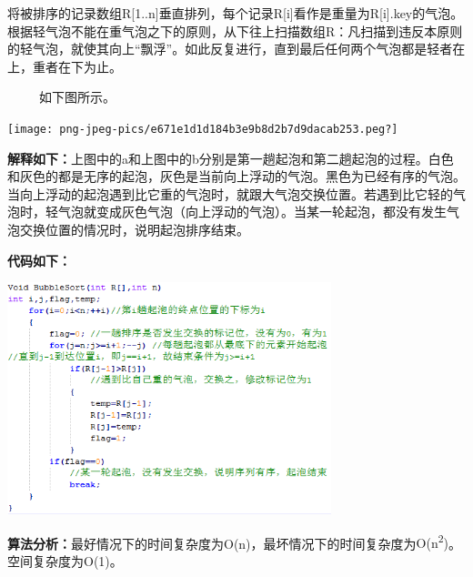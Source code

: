 {将被排序的记录数组R{[}1..n{]}垂直排列，每个记录R{[}i{]}看作是重量为R{[}i{]}.key的气泡。根据轻气泡不能在重气泡之下的原则，从下往上扫描数组R：凡扫描到违反本原则的轻气泡，就使其向上``飘浮''。如此反复进行，直到最后任何两个气泡都是轻者在上，重者在下为止。}

{~ ~ ~ 如下图所示。}

{\texttt{[image: png-jpeg-pics/e671e1d1d184b3e9b8d2b7d9dacab253.peg?]}\\
\hspace*{0.333em}}

{\textbf{解释如下：}上图中的a和上图中的b分别是第一趟起泡和第二趟起泡的过程。白色和灰色的都是无序的起泡，灰色是当前向上浮动的气泡。黑色为已经有序的气泡。当向上浮动的起泡遇到比它重的气泡时，就跟大气泡交换位置。若遇到比它轻的气泡时，轻气泡就变成灰色气泡（向上浮动的气泡）。当某一轮起泡，都没有发生气泡交换位置的情况时，说明起泡排序结束。}

{\textbf{代码如下：}}{}

\includegraphics[width=3.70833in,height=2.65625in]{png-jpeg-pics/232C7FCF5B9C314B522DA40F90E151B7.png}

{\textbf{算法分析：}最好情况下的时间复杂度为}{O(n)}{，最坏情况下的时间复杂度为}{O(n\textsuperscript{2})}{。空间复杂度为}{O(1)}{。}
